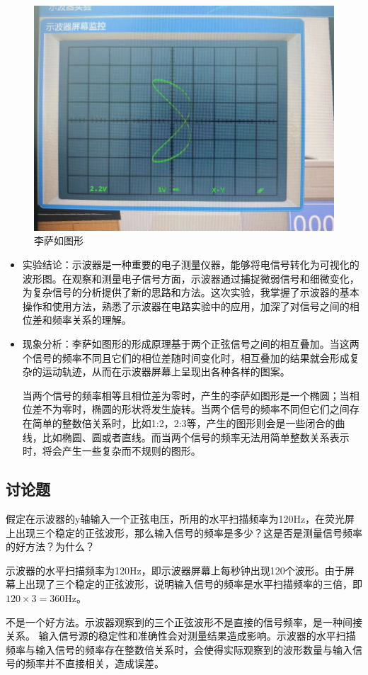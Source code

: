 \documentclass[signature=data]{physicsreport}
\begin{document}
\begin{figure}[htbp]
\begin{minipage}[t]{0.3\textwidth}
        \includegraphics[width=\textwidth]{images/lab6/image3.jpg}
        \caption{}
    \end{minipage}

    \caption*{李萨如图形}
\end{figure}

\begin{itemize}
    \item 实验结论：示波器是一种重要的电子测量仪器，能够将电信号转化为可视化的波形图。在观察和测量电子信号方面，示波器通过捕捉微弱信号和细微变化，为复杂信号的分析提供了新的思路和方法。这次实验，我掌握了示波器的基本操作和使用方法，熟悉了示波器在电路实验中的应用，加深了对信号之间的相位差和频率关系的理解。
    \vspace{1em}
    \item 现象分析：李萨如图形的形成原理基于两个正弦信号之间的相互叠加。当这两个信号的频率不同且它们的相位差随时间变化时，相互叠加的结果就会形成复杂的运动轨迹，从而在示波器屏幕上呈现出各种各样的图案。
    
    当两个信号的频率相等且相位差为零时，产生的李萨如图形是一个椭圆；当相位差不为零时，椭圆的形状将发生旋转。当两个信号的频率不同但它们之间存在简单的整数倍关系时，比如1:2，2:3等，产生的图形则会是一些闭合的曲线，比如椭圆、圆或者直线。而当两个信号的频率无法用简单整数关系表示时，将会产生一些复杂而不规则的图形。
\end{itemize}

\vspace{3em}

\subsection{讨论题}
假定在示波器的y轴输入一个正弦电压，所用的水平扫描频率为120Hz，在荧光屏上出现三个稳定的正弦波形，那么输入信号的频率是多少？这是否是测量信号频率的好方法？为什么？

\vspace{2em}

示波器的水平扫描频率为120Hz，即示波器屏幕上每秒钟出现120个波形。由于屏幕上出现了三个稳定的正弦波形，说明输入信号的频率是水平扫描频率的三倍，即$120\times3=360$Hz。

不是一个好方法。示波器观察到的三个正弦波形不是直接的信号频率，是一种间接关系。 输入信号源的稳定性和准确性会对测量结果造成影响。示波器的水平扫描频率与输入信号的频率存在整数倍关系时，会使得实际观察到的波形数量与输入信号的频率并不直接相关，造成误差。
\end{document}
